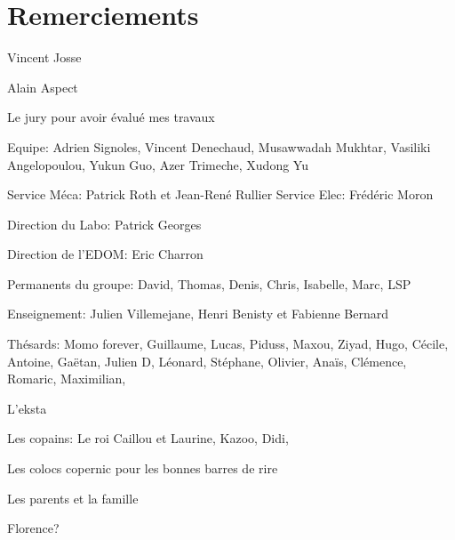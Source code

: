 \chapterimage{}
\chapter*{Remerciements}

Vincent Josse

Alain Aspect

Le jury pour avoir évalué mes travaux

Equipe: Adrien Signoles, Vincent Denechaud, Musawwadah Mukhtar, Vasiliki Angelopoulou, Yukun Guo, Azer Trimeche, Xudong Yu

Service Méca: Patrick Roth et Jean-René Rullier
Service Elec: Frédéric Moron

Direction du Labo: Patrick Georges

Direction de l'EDOM: Eric Charron

Permanents du groupe: David, Thomas, Denis, Chris, Isabelle, Marc, LSP

Enseignement: Julien Villemejane, Henri Benisty et Fabienne Bernard

Thésards: Momo forever, Guillaume, Lucas, Piduss, Maxou, Ziyad, Hugo, Cécile, Antoine, Gaëtan, Julien D, Léonard, Stéphane, Olivier, Anaïs, Clémence, Romaric, Maximilian, 

L'eksta

Les copains: Le roi Caillou et Laurine, Kazoo, Didi, 

Les colocs copernic pour les bonnes barres de rire

Les parents et la famille

Florence?


